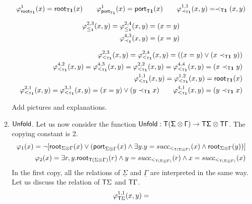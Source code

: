\begin{pr}
\begin{enumerate}
\begin{align*}
\varphi^1_{\mathsf{root}_{\mathsf T\mathbf{1}}}(x)=\mathsf{root}_{\mathsf T\mathbf{1}}(x) \qquad \varphi^1_{\mathsf{port}_{\mathsf T\mathbf{1}}}(x)=\mathsf{port}_{\mathsf T\mathbf{1}}(x)
\qquad\varphi^{1,1}_{\prec_{\mathsf T\mathbf{1}}}(x,y)=\prec_{\mathsf T\mathbf{1}}(x,y) 
\end{align*}

\begin{align*}
\varphi^{2,3}_{\leq_{\mathbf{1}}}(x,y) = \varphi^{2,4}_{\leq_{\mathbf{1}}}(x,y) = (x=y)\\
\varphi^{4,3}_{\prec_{\mathbf{1}}}(x,y) =(x=y)
\end{align*}

\begin{align*}
\varphi^{2,3}_{<_{\mathsf T\mathbf{1}}}(x,y)= \varphi^{2,4}_{<_{\mathsf T\mathbf{1}}}(x,y)= ((x=y) \vee (x\prec_{\mathsf T\mathbf{1}} y))\\
\varphi^{4,2}_{<_{\mathsf T\mathbf{1}}}(x,y)=\varphi^{4,3}_{<_{\mathsf T\mathbf{1}}}(x,y)=\varphi^{2,2}_{<_{\mathsf T\mathbf{1}}}(x,y)= \varphi^{4,4}_{<_{\mathsf T\mathbf{1}}}(x,y)= (x\prec_{\mathsf T\mathbf{1}} y)\\
\varphi^{1,1}_{<_{\mathsf T\mathbf{1}}}(x,y)=\varphi^{1,2}_{<_{\mathsf T\mathbf{1}}}(x,y)= \mathsf{root}_{\mathsf T\mathbf{1}}(x)\\
\varphi^{2,1}_{<_{\mathsf T\mathbf{1}}}(x,y)=\varphi^{3,1}_{<_{\mathsf T\mathbf{1}}}(x,y)=(x=y) \vee (y\prec_{\mathsf T\mathbf{1}} x)\qquad 
\varphi^{4,1}_{<_{\mathsf T\mathbf{1}}}(x,y)=(y\prec_{\mathsf T\mathbf{1}} x)
\end{align*}
\begin{center}
Add pictures and explanations.
\end{center}
\item $\sf{Unfold}$. Let us now consider the function $\sf{Unfold}:\mathsf T(\Sigma\otimes \Gamma)\to \mathsf T\Sigma\otimes\mathsf T\Gamma$. The copying constant is 2. 
\begin{align*}
\varphi_1(x)=\neg [\mathsf{root}_{\Sigma\otimes\Gamma}(x)\vee (\mathsf{port}_{\Sigma\otimes\Gamma}(x)\wedge \exists y. y=succ_{<_{\mathsf T(\Sigma\otimes\Gamma)}}(x) \wedge \mathsf{root}_{\Sigma\otimes\Gamma}(y))]\\
\varphi_2(x)=\exists r, y. \mathsf{root}_{\mathsf T(\Sigma\otimes\Gamma)}(r) \wedge y=succ_{<_{\mathsf T(\Sigma\otimes\Gamma)}}(r) \wedge x= succ_{<_{\mathsf T(\Sigma\otimes\Gamma)}}(x) 
\end{align*}
In the first copy, all the relations of $\underline{\Sigma}$ and $\underline{\Gamma}$ are interpreted in the same way. 
Let us discuss the relation of $\mathsf T\Sigma$ and $\mathsf T\Gamma$.
\[\varphi^{1,1}_{\mathsf T\Sigma}(x,y)=\] 
\end{enumerate} 

 \end{pr}